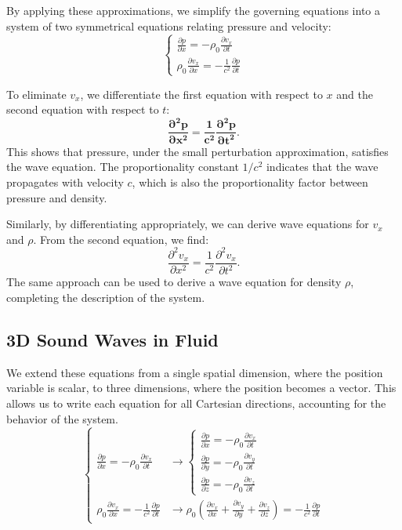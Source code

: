\documentclass[a4paper]{article}
\begin{document}
By applying these approximations, we simplify the governing equations into a system of two symmetrical equations relating pressure and velocity:
\begin{equation}
\label{eq:acoustic_wave_equations}
\begin{cases}
\frac{\partial p}{\partial x} = -\rho_0 \frac{\partial v_x}{\partial t} \\
\rho_0 \frac{\partial v_x}{\partial x} = -\frac{1}{c^2} \frac{\partial p}{\partial t}
\end{cases}
\end{equation}

To eliminate \(v_x\), we differentiate the first equation with respect to \(x\) and the second equation with respect to \(t\):
\[
\mathbf{\frac{\partial^2 p}{\partial x^2} = \frac{1}{c^2} \frac{\partial^2 p}{\partial t^2}}.
\]
This shows that pressure, under the small perturbation approximation, satisfies the wave equation. The proportionality constant \(1/c^2\) indicates that the wave propagates with velocity \(c\), which is also the proportionality factor between pressure and density.

Similarly, by differentiating appropriately, we can derive wave equations for \(v_x\) and \(\rho\). From the second equation, we find:
\[
\frac{\partial^2 v_x}{\partial x^2} = \frac{1}{c^2} \frac{\partial^2 v_x}{\partial t^2}.
\]
The same approach can be used to derive a wave equation for density \(\rho\), completing the description of the system.


\subsection{3D Sound Waves in Fluid}

We extend these equations from a single spatial dimension, where the position variable is scalar, to three dimensions, where the position becomes a vector. This allows us to write each equation for all Cartesian directions, accounting for the behavior of the system.
\[
\begin{cases}
\frac{\partial p}{\partial x} = -\rho_0 \frac{\partial v_x}{\partial t} & \rightarrow
\begin{cases}
\frac{\partial p}{\partial x} = -\rho_0 \frac{\partial v_x}{\partial t} \\
\frac{\partial p}{\partial y} = -\rho_0 \frac{\partial v_y}{\partial t} \\
\frac{\partial p}{\partial z} = -\rho_0 \frac{\partial v_z}{\partial t}
\end{cases} \\[10pt]
\rho_0 \frac{\partial v_x}{\partial x} = -\frac{1}{c^2} \frac{\partial p}{\partial t} & \rightarrow
\rho_0 \left( \frac{\partial v_x}{\partial x} + \frac{\partial v_y}{\partial y} + \frac{\partial v_z}{\partial z} \right) = -\frac{1}{c^2} \frac{\partial p}{\partial t}
\end{cases}
\]
\end{document}
